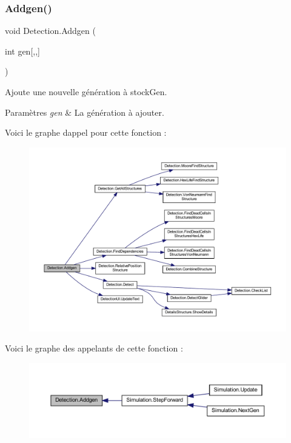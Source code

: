 \subsubsection{\texorpdfstring{Addgen()}{Addgen()}}
{\footnotesize\ttfamily void Detection.\+Addgen (\begin{DoxyParamCaption}\item[{int}]{gen\mbox{[},,\mbox{]} }\end{DoxyParamCaption})\hspace{0.3cm}{\ttfamily [inline]}}



Ajoute une nouvelle génération à stock\+Gen. 


\begin{DoxyParams}{Paramètres}
{\em gen} & La génération à ajouter.\\
\hline
\end{DoxyParams}
Voici le graphe d\textquotesingle{}appel pour cette fonction \+:
\nopagebreak
\begin{figure}[H]
\begin{center}
\leavevmode
\includegraphics[width=350pt]{class_detection_a92c60be1a69ea74b7f7bef04a0e53238_cgraph}
\end{center}
\end{figure}
Voici le graphe des appelants de cette fonction \+:\nopagebreak
\begin{figure}[H]
\begin{center}
\leavevmode
\includegraphics[width=350pt]{class_detection_a92c60be1a69ea74b7f7bef04a0e53238_icgraph}
\end{center}
\end{figure}
\mbox{\label{class_detection_a96c6d9a8e299f137a4fb84d2ea80e092}} 
